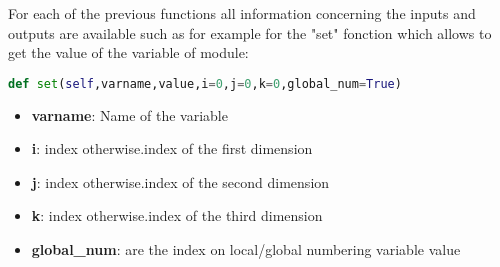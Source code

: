 For each of the previous functions all information concerning the inputs and
outputs are available such as for example for the "set" fonction which allows
to get the value of the variable of \telemacsystem module:

\begin{lstlisting}[language=Python]
def set(self,varname,value,i=0,j=0,k=0,global_num=True)
\end{lstlisting}

\begin{itemize}
\item \textbf{varname}: Name of the variable
\item \textbf{i}: index otherwise.index of the first dimension
\item \textbf{j}: index otherwise.index of the second dimension
\item \textbf{k}: index otherwise.index of the third dimension
\item \textbf{global\_num}: are the index on local/global numbering variable
  value
\end{itemize}
